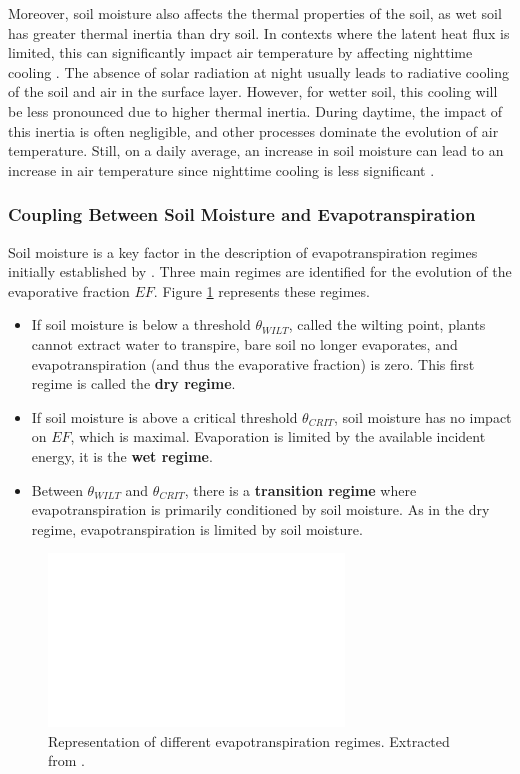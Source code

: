Moreover, soil moisture also affects the thermal properties of the soil, as wet soil has greater thermal inertia than dry soil. In contexts where the latent heat flux is limited, this can significantly impact air temperature by affecting nighttime cooling \citep{ait-mesbah_role_2015}. The absence of solar radiation at night usually leads to radiative cooling of the soil and air in the surface layer. However, for wetter soil, this cooling will be less pronounced due to higher thermal inertia. During daytime, the impact of this inertia is often negligible, and other processes dominate the evolution of air temperature. Still, on a daily average, an increase in soil moisture can lead to an increase in air temperature since nighttime cooling is less significant \citep{cheruy_role_2017}.

\subsubsection*{Coupling Between Soil Moisture and Evapotranspiration}

Soil moisture is a key factor in the description of evapotranspiration regimes initially established by \citet{Budyko_1956, Budyko_1974}. Three main regimes are identified for the evolution of the evaporative fraction $EF$. Figure \ref{fig:evap_regimes} represents these regimes.

\begin{itemize}
    \item If soil moisture is below a threshold $\theta_{WILT}$, called the wilting point, plants cannot extract water to transpire, bare soil no longer evaporates, and evapotranspiration (and thus the evaporative fraction) is zero. This first regime is called the \textbf{dry regime}.
    \item If soil moisture is above a critical threshold $\theta_{CRIT}$, soil moisture has no impact on $EF$, which is maximal. Evaporation is limited by the available incident energy, it is the \textbf{wet regime}.
    \item Between $\theta_{WILT}$ and $\theta_{CRIT}$, there is a \textbf{transition regime} where evapotranspiration is primarily conditioned by soil moisture. As in the dry regime, evapotranspiration is limited by soil moisture.
\end{itemize}

\begin{figure}[ht]
    \centering
    \includegraphics[width=0.7\textwidth]{images/evap_regimes.png}
    \caption{Representation of different evapotranspiration regimes. Extracted from \citet{seneviratne_investigating_2010}.}
    \label{fig:evap_regimes}
\end{figure}

